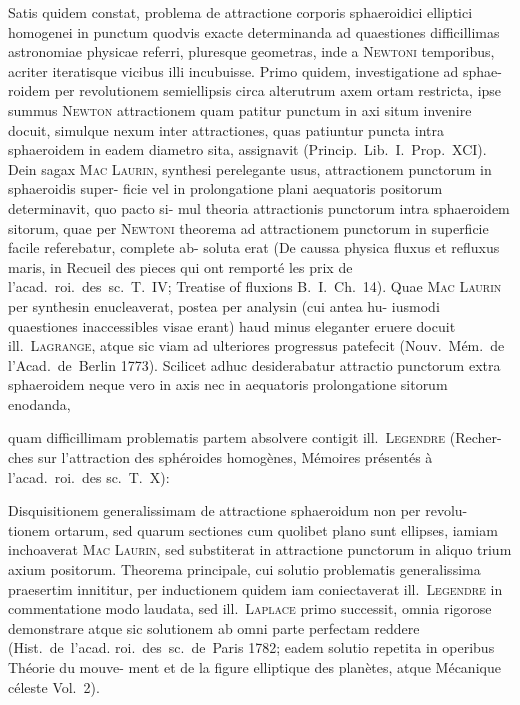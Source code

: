 \documentclass[12pt,a4paper]{article}
\theoremstyle{gauss}
\begin{document}
\vspace{8pt}

Satis quidem constat, problema de attractione corporis sphaeroidici elliptici
homogenei in punctum quodvis exacte determinanda ad quaestiones difficillimas
astronomiae physicae referri, pluresque geometras, inde a \textsc{Newtoni} temporibus,
acriter iteratisque vicibus illi incubuisse. Primo quidem, investigatione ad sphae-
roidem per revolutionem semiellipsis circa alterutrum axem ortam restricta, ipse
summus \textsc{Newton} attractionem quam patitur punctum in axi situm invenire docuit,
simulque nexum inter attractiones, quas patiuntur puncta intra sphaeroidem in
eadem diametro sita, assignavit (Princip.~Lib.~I.~Prop.~XCI). Dein sagax \textsc{Mac
Laurin}, synthesi perelegante usus, attractionem punctorum in sphaeroidis super-
ficie vel in prolongatione plani aequatoris positorum determinavit, quo pacto si-
mul theoria attractionis punctorum intra sphaeroidem sitorum, quae per \textsc{Newtoni}
theorema ad attractionem punctorum in superficie facile referebatur, complete ab-
soluta erat (De caussa physica fluxus et refluxus maris, in Recueil des pieces qui
ont remport\'e les prix de l'acad.~roi.~des~sc.~T.~IV; Treatise of fluxions B.~I.~Ch.~14).
Quae \textsc{Mac Laurin} per synthesin enucleaverat, postea per analysin (cui antea hu-
iusmodi quaestiones inaccessibles visae erant) haud minus eleganter eruere docuit
ill.~\textsc{Lagrange}, atque sic viam ad ulteriores progressus patefecit (Nouv.~M\'em.~de
l'Acad.~de~Berlin 1773). Scilicet adhuc desiderabatur attractio punctorum extra
sphaeroidem neque vero in axis nec in aequatoris prolongatione sitorum enodanda,

\newpage
\setcounter{page}{12}

quam difficillimam problematis partem absolvere contigit ill.~\textsc{Legendre} (Recher-
ches sur l'attraction des sph\'eroides homog\`enes, M\'emoires pr\'esent\'es \`a l'acad.~roi.~des
sc.~T.~X):

Disquisitionem generalissimam de attractione sphaeroidum non per revolu-
tionem ortarum, sed quarum sectiones cum quolibet plano sunt ellipses, iamiam
inchoaverat \textsc{Mac Laurin}, sed substiterat in attractione punctorum in aliquo trium
axium positorum. Theorema principale, cui solutio problematis generalissima
praesertim innititur, per inductionem quidem iam coniectaverat ill.~\textsc{Legendre} in
commentatione modo laudata, sed ill.~\textsc{Laplace} primo successit, omnia rigorose
demonstrare atque sic solutionem ab omni parte perfectam reddere (Hist.~de~l'acad.
roi.~des~sc.~de~Paris 1782; eadem solutio repetita in operibus Th\'eorie du mouve-
ment et de la figure elliptique des plan\`etes, atque M\'ecanique c\'eleste Vol.~2).
\end{document}
